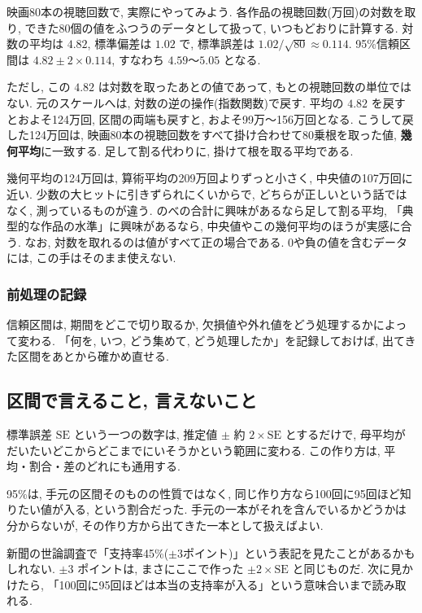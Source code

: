     映画80本の視聴回数で, 実際にやってみよう.
    各作品の視聴回数(万回)の対数を取り, できた80個の値をふつうのデータとして扱って, いつもどおりに計算する.
    対数の平均は $4.82$, 標準偏差は $1.02$ で, 標準誤差は $1.02/\sqrt{80} \approx 0.114$.
    95\%信頼区間は $4.82 \pm 2 \times 0.114$, すなわち $4.59$〜$5.05$ となる.

    ただし, この $4.82$ は対数を取ったあとの値であって, もとの視聴回数の単位ではない.
    元のスケールへは, 対数の逆の操作(指数関数)で戻す.
    平均の $4.82$ を戻すとおよそ124万回, 区間の両端も戻すと, およそ99万〜156万回となる.
    こうして戻した124万回は, 映画80本の視聴回数をすべて掛け合わせて80乗根を取った値, \textbf{幾何平均}に一致する.
    足して割る代わりに, 掛けて根を取る平均である.

    幾何平均の124万回は, 算術平均の209万回よりずっと小さく, 中央値の107万回に近い.
    少数の大ヒットに引きずられにくいからで, どちらが正しいという話ではなく, 測っているものが違う.
    のべの合計に興味があるなら足して割る平均, 「典型的な作品の水準」に興味があるなら, 中央値やこの幾何平均のほうが実感に合う.
    なお, 対数を取れるのは値がすべて正の場合である.
    0や負の値を含むデータには, この手はそのまま使えない.

    \subsubsection*{前処理の記録}

    信頼区間は, 期間をどこで切り取るか, 欠損値や外れ値をどう処理するかによって変わる.
    「何を, いつ, どう集めて, どう処理したか」を記録しておけば, 出てきた区間をあとから確かめ直せる.

  \subsection{区間で言えること, 言えないこと}

    標準誤差 $\mathrm{SE}$ という一つの数字は, 推定値 $\pm$ 約 $2 \times \mathrm{SE}$ とするだけで, 母平均がだいたいどこからどこまでにいそうかという範囲に変わる.
    この作り方は, 平均・割合・差のどれにも通用する.

    95\%は, 手元の区間そのものの性質ではなく, 同じ作り方なら100回に95回ほど知りたい値が入る, という割合だった.
    手元の一本がそれを含んでいるかどうかは分からないが, その作り方から出てきた一本として扱えばよい.

    新聞の世論調査で「支持率45\%($\pm 3$ポイント)」という表記を見たことがあるかもしれない.
    $\pm 3$ ポイントは, まさにここで作った $\pm 2 \times \mathrm{SE}$ と同じものだ.
    次に見かけたら, 「100回に95回ほどは本当の支持率が入る」という意味合いまで読み取れる.

